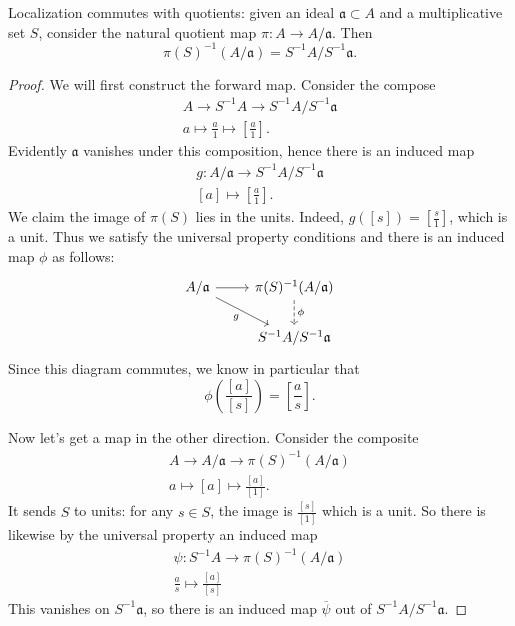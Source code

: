 \documentclass[12pt]{article}
\begin{document}
\begin{proposition}
	Localization commutes with quotients: given an ideal $\mathfrak{a}\subset A$ and a multiplicative set $S$, consider the natural quotient map $\pi: A \to A/\mathfrak{a}$. Then 
	\begin{equation*}
		\pi(S)^{-1}(A/\mathfrak{a}) = S^{-1}A/S^{-1}\mathfrak{a}.
	\end{equation*}
\end{proposition}
\begin{proof}
	We will first construct the forward map. Consider the compose 
	\begin{gather*}
		A \to S^{-1}A \to S^{-1}A/S^{-1}\mathfrak{a} \\
		a \mapsto \frac{a}{1} \mapsto [\frac{a}{1}].
	\end{gather*}
	Evidently $\mathfrak{a}$ vanishes under this composition, hence there is an induced map 
	\begin{gather*}
		g: A/\mathfrak{a} \to S^{-1}A/S^{-1}\mathfrak{a} \\
		[a] \mapsto [\frac{a}{1}].
	\end{gather*}
	We claim the image of $\pi(S)$ lies in the units. Indeed, $g([s])=[\frac{s}{1}]$, which is a unit. Thus we satisfy the universal property conditions and there is an induced map $\phi$ as follows:
	\begin{equation*}
\begin{tikzcd}
A/\mathfrak{a} \arrow[r] \arrow[rd, "g"'] & \pi(S)^{-1}(A/\mathfrak{a}) \arrow[d, "\phi", dashed] \\
                                          & S^{-1}A / S^{-1}\mathfrak{a}                         
\end{tikzcd}
	\end{equation*}
	Since this diagram commutes, we know in particular that 
	\begin{equation*}
		\phi(\frac{[a]}{[s]}) = [\frac{a}{s}].
	\end{equation*}

	Now let's get a map in the other direction. Consider the composite 
	\begin{gather*}
		A \to A/\mathfrak{a} \to \pi(S)^{-1}(A/\mathfrak{a}) \\
		a \mapsto [a] \mapsto \frac{[a]}{[1]}.
	\end{gather*}
	It sends $S$ to units: for any $s\in S$, the image is $\frac{[s]}{[1]}$ which is a unit. So there is likewise by the universal property an induced map 
	\begin{gather*}
		\psi: S^{-1}A \to \pi(S)^{-1}(A/\mathfrak{a}) \\
		\frac{a}{s} \mapsto \frac{[a]}{[s]}
	\end{gather*}
	This vanishes on $S^{-1}\mathfrak{a}$, so there is an induced map $\overline{\psi}$ out of $S^{-1}A/S^{-1}\mathfrak{a}$.


\end{proof}
\end{document}
